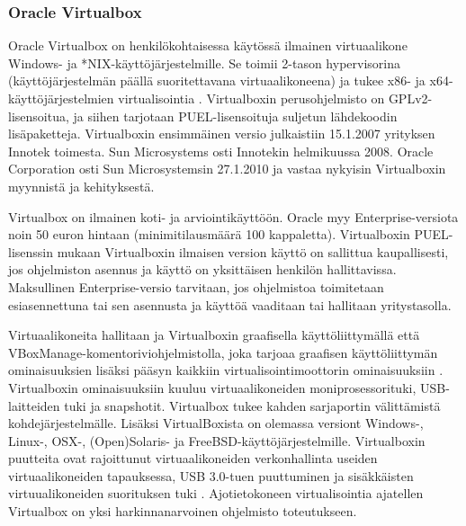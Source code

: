 \subsubsection{Oracle Virtualbox}
Oracle Virtualbox on henkilökohtaisessa käytössä ilmainen virtuaalikone Windows- ja *NIX-käyttöjärjestelmille. Se toimii 2-tason hypervisorina (käyttöjärjestelmän päällä suoritettavana virtuaalikoneena) ja tukee x86- ja x64-käyttöjärjestelmien virtualisointia \cite{virtualbox_manual}. Virtualboxin perusohjelmisto on GPLv2-lisensoitua, ja siihen tarjotaan  PUEL-lisensoituja suljetun lähdekoodin lisäpaketteja. Virtualboxin ensimmäinen versio julkaistiin 15.1.2007 yrityksen Innotek toimesta. Sun Microsystems osti Innotekin helmikuussa 2008. Oracle Corporation osti Sun Microsystemsin 27.1.2010 ja vastaa nykyisin Virtualboxin myynnistä ja kehityksestä.



Virtualbox on ilmainen koti- ja arviointikäyttöön. Oracle myy Enterprise-versiota noin 50 euron hintaan (minimitilausmäärä 100 kappaletta).
Virtualboxin PUEL-lisenssin mukaan Virtualboxin ilmaisen version käyttö on sallittua kaupallisesti, jos ohjelmiston asennus ja käyttö on yksittäisen henkilön hallittavissa. Maksullinen Enterprise-versio tarvitaan, jos ohjelmistoa toimitetaan esiasennettuna tai sen asennusta ja käyttöä vaaditaan tai hallitaan yritystasolla.\citep{virtualbox_puel,virtualbox_licensing}

Virtuaalikoneita hallitaan ja Virtualboxin graafisella käyttöliittymällä että VBoxManage-komentoriviohjelmistolla, joka tarjoaa graafisen käyttöliittymän ominaisuuksien lisäksi pääsyn kaikkiin virtualisointimoottorin ominaisuuksiin \cite{virtualbox_manual}. Virtualboxin ominaisuuksiin kuuluu virtuaalikoneiden moniprosessorituki, USB-laitteiden tuki ja snapshotit. Virtualbox tukee kahden sarjaportin välittämistä kohdejärjestelmälle. Lisäksi VirtualBoxista on olemassa versiont Windows-, Linux-, OSX-, (Open)Solaris- ja FreeBSD-käyttöjärjestelmille. Virtualboxin puutteita ovat rajoittunut virtuaalikoneiden verkonhallinta useiden virtuaalikoneiden tapauksessa, USB 3.0-tuen puuttuminen ja sisäkkäisten virtuualikoneiden suorituksen tuki \cite{vplayervsvbox}. Ajotietokoneen virtualisointia ajatellen Virtualbox on yksi harkinnanarvoinen ohjelmisto toteutukseen.


